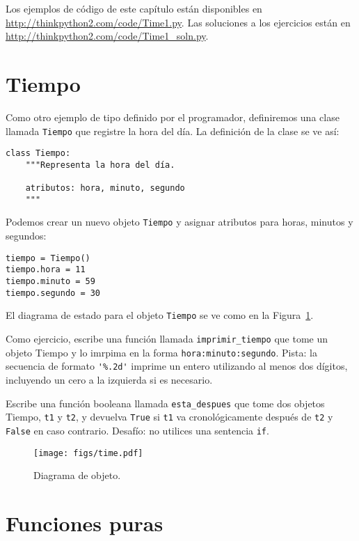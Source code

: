 \documentclass[10pt]{book}
\begin{document}
Los ejemplos de código de este capítulo están disponibles en
\url{http://thinkpython2.com/code/Time1.py}.
Las soluciones a los ejercicios están en
\url{http://thinkpython2.com/code/Time1_soln.py}.


\section{Tiempo}
\label{isafter}

Como otro ejemplo de tipo definido por el programador, definiremos una clase
llamada {\tt Tiempo} que registre la hora del día.  La definición de la clase
se ve así: 
  

\begin{verbatim}
class Tiempo:
    """Representa la hora del día.

    atributos: hora, minuto, segundo
    """
\end{verbatim}
%
Podemos crear un nuevo objeto {\tt Tiempo} y asignar
atributos para horas, minutos y segundos:

\begin{verbatim}
tiempo = Tiempo()
tiempo.hora = 11
tiempo.minuto = 59
tiempo.segundo = 30
\end{verbatim}
%
El diagrama de estado para el objeto {\tt Tiempo} se ve como en la Figura~\ref{fig.time}.

Como ejercicio, escribe una función llamada \verb"imprimir_tiempo" que tome un
objeto Tiempo y lo imrpima en la forma {\tt hora:minuto:segundo}.
Pista: la secuencia de formato \verb"'%.2d'" imprime un entero utilizando
al menos dos dígitos, incluyendo un cero a la izquierda si es necesario.

Escribe una función booleana llamada \verb"esta_despues" que
tome dos objetos Tiempo, {\tt t1} y {\tt t2}, y
devuelva {\tt True} si {\tt t1} va cronológicamente después de {\tt t2} y
{\tt False} en caso contrario.  Desafío: no utilices una sentencia {\tt if}.

\begin{figure}
\centerline
{\texttt{[image: figs/time.pdf]}}
\caption{Diagrama de objeto.}
\label{fig.time}
\end{figure}


\section{Funciones puras}
\end{document}
